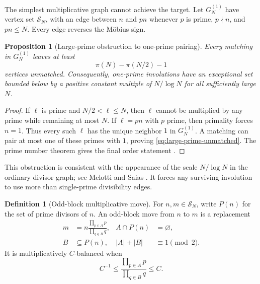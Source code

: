 \documentclass[11pt]{amsart}
\numberwithin{equation}{section}
\theoremstyle{plain}
\newtheorem{proposition}[theorem]{Proposition}
\theoremstyle{definition}
\newtheorem{definition}[theorem]{Definition}
\theoremstyle{remark}
\begin{document}
The simplest multiplicative graph cannot achieve the target.  Let \(G_N^{(1)}\)
have vertex set \(\mathcal S_N\), with an edge between \(n\) and \(pn\) whenever
\(p\) is prime, \(p\nmid n\), and \(pn\leq N\).  Every edge reverses the
M\"obius sign.

\begin{proposition}[Large-prime obstruction to one-prime pairing]
\label{prop:one-prime-obstruction}
Every matching in \(G_N^{(1)}\) leaves at least
\begin{equation}
  \pi(N)-\pi(N/2)-1
  \label{eq:large-prime-unmatched}
\end{equation}
vertices unmatched.  Consequently, one-prime involutions have an exceptional
set bounded below by a positive constant multiple of \(N/\log N\) for all
sufficiently large \(N\).
\end{proposition}

\begin{proof}
If \(\ell\) is prime and \(N/2<\ell\leq N\), then \(\ell\) cannot be multiplied
by any prime while remaining at most \(N\).  If \(\ell=pn\) with \(p\) prime,
then primality forces \(n=1\).  Thus every such \(\ell\) has the unique neighbor
\(1\) in \(G_N^{(1)}\).  A matching can pair at most one of these primes with
\(1\), proving \eqref{eq:large-prime-unmatched}.  The prime number theorem gives
the final order statement \cite{MontgomeryVaughan2007}.
\end{proof}

This obstruction is consistent with the appearance of the scale
\(N/\log N\) in the ordinary divisor graph; see Melotti and Saias
\cite{MelottiSaias2020}.  It forces any surviving involution to use more than
single-prime divisibility edges.

\begin{definition}[Odd-block multiplicative move]
\label{def:odd-block-move}
For \(n,m\in\mathcal S_N\), write \(P(n)\) for the set of prime divisors of
\(n\).  An odd-block move from \(n\) to \(m\) is a replacement
\begin{equation}
\begin{aligned}
  m&=n\frac{\prod_{p\in A}p}{\prod_{q\in B}q},
  & A\cap P(n)&=\varnothing,\\
  B&\subseteq P(n),
  & |A|+|B|&\equiv1\pmod 2.
\end{aligned}
  \label{eq:odd-block-move}
\end{equation}
It is multiplicatively \(C\)-balanced when
\begin{equation}
  C^{-1}\leq
  \frac{\prod_{p\in A}p}{\prod_{q\in B}q}
  \leq C.
  \label{eq:block-balance}
\end{equation}
\end{definition}
\end{document}
